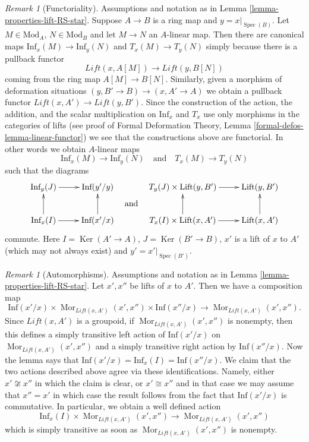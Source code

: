 \documentclass{stacks-project}
\theoremstyle{plain}
\theoremstyle{definition}
\theoremstyle{remark}
\newtheorem{remark}[subsection]{Remark}
\numberwithin{equation}{subsection}
\def\Spec{\mathop{\mathrm{Spec}}}
\def\Mor{\mathop{\mathrm{Mor}}\nolimits}
\def\Ker{\mathop{\mathrm{Ker}}}
\begin{document}
\begin{remark}[Functoriality]
\label{remark-functoriality}
Assumptions and notation as in Lemma \ref{lemma-properties-lift-RS-star}.
Suppose $A \to B$ is a ring map and $y = x|_{\Spec(B)}$.
Let $M \in \text{Mod}_A$, $N \in \text{Mod}_B$
and let $M \to N$ an $A$-linear map. Then there are canonical maps
$\text{Inf}_x(M) \to \text{Inf}_y(N)$ and
$T_x(M) \to T_y(N)$ simply because there is a pullback functor
$$
\textit{Lift}(x, A[M]) \to \textit{Lift}(y, B[N])
$$
coming from the ring map $A[M] \to B[N]$. Similarly, given a morphism of
deformation situations $(y, B' \to B) \to (x, A' \to A)$ we obtain a pullback
functor $\textit{Lift}(x, A') \to \textit{Lift}(y, B')$. Since the
construction of the action, the addition, and the scalar multiplication
on $\text{Inf}_x$ and $T_x$ use only morphisms in the categories of lifts
(see proof of
Formal Deformation Theory, Lemma
\ref{formal-defos-lemma-linear-functor})
we see that the constructions above are functorial. In other words we
obtain $A$-linear maps
$$
\text{Inf}_x(M) \to \text{Inf}_y(N)
\quad\text{and}\quad
T_x(M) \to T_y(N)
$$
such that the diagrams
$$
\vcenter{
\xymatrix{
\text{Inf}_y(J) \ar[r] & \text{Inf}(y'/y) \\
\text{Inf}_x(I) \ar[r] \ar[u] & \text{Inf}(x'/x) \ar[u]
}
}
\quad\text{and}\quad
\vcenter{
\xymatrix{
T_y(J) \times \text{Lift}(y, B') \ar[r] & \text{Lift}(y, B') \\
T_x(I) \times \text{Lift}(x, A') \ar[r] \ar[u] & \text{Lift}(x, A') \ar[u]
}
}
$$
commute. Here $I = \Ker(A' \to A)$, $J = \Ker(B' \to B)$,
$x'$ is a lift of $x$ to $A'$ (which may not always exist) and
$y' = x'|_{\Spec(B')}$.
\end{remark}

\begin{remark}[Automorphisms]
\label{remark-automorphisms}
Assumptions and notation as in Lemma \ref{lemma-properties-lift-RS-star}.
Let $x', x''$ be lifts of $x$ to $A'$. Then we have a composition
map
$$
\text{Inf}(x'/x) \times
\Mor_{\textit{Lift}(x, A')}(x', x'') \times \text{Inf}(x''/x)
\longrightarrow
\Mor_{\textit{Lift}(x, A')}(x', x'').
$$
Since $\textit{Lift}(x, A')$ is a groupoid, if
$\Mor_{\textit{Lift}(x, A')}(x', x'')$ is nonempty, then this defines
a simply transitive left action of $\text{Inf}(x'/x)$ on
$\Mor_{\textit{Lift}(x, A')}(x', x'')$ and a simply transitive
right action by $\text{Inf}(x''/x)$. Now the lemma says that
$\text{Inf}(x'/x) = \text{Inf}_x(I) = \text{Inf}(x''/x)$.
We claim that the two actions described above agree via these identifications.
Namely, either $x' \not \cong x''$ in which the claim is clear, or
$x' \cong x''$ and in that case we may assume that $x'' = x'$ in which
case the result follows from the fact that $\text{Inf}(x'/x)$ is
commutative. In particular, we obtain a well defined action
$$
\text{Inf}_x(I) \times \Mor_{\textit{Lift}(x, A')}(x', x'')
\longrightarrow
\Mor_{\textit{Lift}(x, A')}(x', x'')
$$
which is simply transitive as soon as $\Mor_{\textit{Lift}(x, A')}(x', x'')$
is nonempty.
\end{remark}
\end{document}
